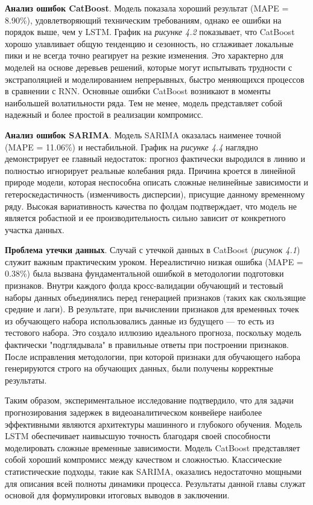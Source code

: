  \textbf{Анализ ошибок CatBoost}. Модель показала хороший результат (MAPE = 8.90\%), удовлетворяющий техническим требованиям, однако ее ошибки на порядок выше, чем у LSTM. График на \textit{рисунке 4.2} показывает, что CatBoost хорошо улавливает общую тенденцию и сезонность, но сглаживает локальные пики и не всегда точно реагирует на резкие изменения. Это характерно для моделей на основе деревьев решений, которые могут испытывать трудности с экстраполяцией и моделированием непрерывных, быстро меняющихся процессов в сравнении с RNN. Основные ошибки CatBoost возникают в моменты наибольшей волатильности ряда. Тем не менее, модель представляет собой надежный и более простой в реализации компромисс.

 \textbf{Анализ ошибок SARIMA}. Модель SARIMA оказалась наименее точной (MAPE = 11.06\%) и нестабильной. График на \textit{рисунке 4.4} наглядно демонстрирует ее главный недостаток: прогноз фактически выродился в линию и полностью игнорирует реальные колебания ряда. Причина кроется в линейной природе модели, которая неспособна описать сложные нелинейные зависимости и гетероскедастичность (изменчивость дисперсии), присущие данному временному ряду. Высокая вариативность качества по фолдам подтверждает, что модель не является робастной и ее производительность сильно зависит от конкретного участка данных.

 \textbf{Проблема утечки данных}. Случай с утечкой данных в CatBoost (\textit{рисунок 4.1}) служит важным практическим уроком. Нереалистично низкая ошибка (MAPE = 0.38\%) была вызвана фундаментальной ошибкой в методологии подготовки признаков. Внутри каждого фолда кросс-валидации обучающий и тестовый наборы данных объединялись перед генерацией признаков (таких как скользящие средние и лаги). В результате, при вычислении признаков для временных точек из обучающего набора использовались данные из будущего — то есть из тестового набора. Это создало иллюзию идеального прогноза, поскольку модель фактически "подглядывала" в правильные ответы при построении признаков. После исправления методологии, при которой признаки для обучающего набора генерируются строго на обучающих данных, были получены корректные результаты.


Таким образом, экспериментальное исследование подтвердило, что для задачи прогнозирования задержек в видеоаналитическом конвейере наиболее эффективными являются архитектуры машинного и глубокого обучения. Модель LSTM обеспечивает наивысшую точность благодаря своей способности моделировать сложные временные зависимости. Модель CatBoost представляет собой хороший компромисс между качеством и сложностью. Классические статистические подходы, такие как SARIMA, оказались недостаточно мощными для описания всей полноты динамики процесса. Результаты данной главы служат основой для формулировки итоговых выводов в заключении.
